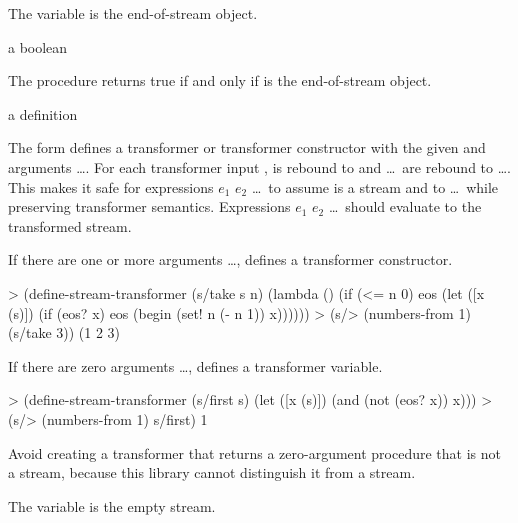 The  variable is the end-of-stream object.

\begin{procedure}
\end{procedure}
\returns{} a boolean

The  procedure returns true if and only if  is the end-of-stream object.

\begin{syntax}
\end{syntax}
\expandsto{} a definition

The  form defines a transformer or transformer constructor
with the given  and arguments  \ldots. For each transformer input
,  is rebound to  and  \ldots\ are
rebound to  \ldots. This makes it safe for expressions $e_1$ $e_2$ \ldots\ to
assume  is a stream and to   \ldots\ while preserving transformer
semantics. Expressions $e_1$ $e_2$ \ldots\ should evaluate to the transformed stream.

If there are one or more arguments  \ldots, 
defines a transformer constructor.

\codebegin
> (define-stream-transformer (s/take s n)
    (lambda ()
      (if (<= n 0)
          eos
          (let ([x (s)])
            (if (eos? x)
                eos
                (begin
                  (set! n (- n 1))
                  x))))))
> (s/> (numbers-from 1) (s/take 3))
(1 2 3)
\codeend

If there are zero arguments  \ldots,  defines a
transformer variable.

\codebegin
> (define-stream-transformer (s/first s)
    (let ([x (s)])
      (and (not (eos? x)) x)))
> (s/> (numbers-from 1) s/first)
1
\codeend

Avoid creating a transformer that returns a zero-argument procedure that is not a stream,
because this library cannot distinguish it from a stream.

\begin{variable}
\end{variable}
\antipar

The  variable is the empty stream.

